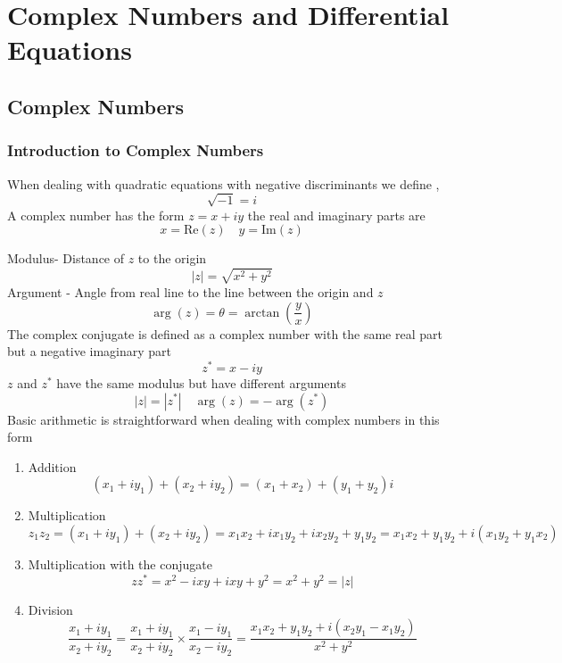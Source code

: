 \documentclass[11pt,titlepage]{article}
\numberwithin{equation}{subsection}
\begin{document}
\section{Complex Numbers and Differential Equations}
\subsection{Complex Numbers}
\subsubsection{Introduction to Complex Numbers}
When dealing with quadratic equations with negative discriminants we define ,
\begin{equation}
    \sqrt{ -1 }=i
\end{equation}
A complex number has the form $z=x+iy$ the real and imaginary parts are
\begin{equation}
    x=\mathrm{Re}(z) \quad y=\mathrm{Im}(z)
\end{equation}

Modulus- Distance of $z$ to the origin
\begin{equation}
    |z|=\sqrt{ x^2+y^2 }
\end{equation}
Argument - Angle from real line to the line between the origin and $z$
\begin{equation}
    \arg(z)=\theta=\arctan\left( \frac{y}{x} \right)
\end{equation}
The complex conjugate is defined as a complex number with the same real part but a negative imaginary part
\begin{equation}
    z^{*}=x-iy
\end{equation}
$z$ and $z^{*}$ have the same modulus but have different arguments
\begin{equation}
    |z|=|z^{*}|\quad\arg(z)=-\arg(z^{*})
\end{equation}
Basic arithmetic is straightforward when dealing with complex numbers in this form
\begin{enumerate}
    \item Addition
\begin{equation}
    (x_{1}+iy_{1})+(x_{2}+iy_{2})=(x_{1}+x_{2})+(y_{1}+y_{2})i
\end{equation}
\item Multiplication
\begin{equation}
    z_{1}z_{2}=(x_{1}+iy_{1})+(x_{2}+iy_{2})=x_{1}x_{2}+ix_{1}y_{2}+ix_{2}y_{2}+y_{1}y_{2}=x_{1}x_{2}+y_{1}y_{2}+i(x_{1}y_{2}+y_{1}x_{2})
\end{equation}
\item Multiplication with the conjugate
\begin{equation}
zz^{*}=x^2-ixy+ixy+y^2=x^2+y^2=|z|
\end{equation}
\item Division
\begin{equation}
    \frac{x_{1}+iy_{1}}{x_{2}+iy_{2}}=\frac{x_{1}+iy_{1}}{x_{2}+iy_{2}}\times\frac{x_{1}-iy_{1}}{x_{2}-iy_{2}}=\frac{x_{1}x_{2}+y_{1}y_{2}+i(x_{2}y_{1}-x_{1}y_{2})}{x^2+y^2}
\end{equation}
\end{enumerate}
\end{document}
